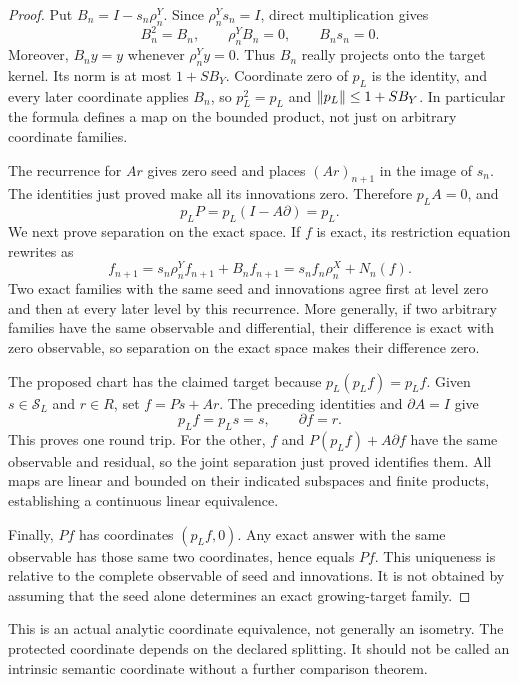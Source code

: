 \begin{proof}
Put \(B_n=I-s_n\rho^Y_n\). Since \(\rho^Y_ns_n=I\), direct multiplication gives
\[
 B_n^2=B_n,\qquad \rho^Y_nB_n=0,\qquad B_ns_n=0.
\]
Moreover, \(B_ny=y\) whenever \(\rho^Y_ny=0\). Thus \(B_n\) really projects onto the target kernel. Its norm is at most \(1+SB_Y\). Coordinate zero of \(p_L\) is the identity, and every later coordinate applies \(B_n\), so \(p_L^2=p_L\) and \(\left\lVert p_L\right\rVert\le1+SB_Y\). In particular the formula defines a map on the bounded product, not just on arbitrary coordinate families.

The recurrence for \(Ar\) gives zero seed and places \((Ar)_{n+1}\) in the image of \(s_n\). The identities just proved make all its innovations zero. Therefore \(p_LA=0\), and
\[
 p_LP=p_L(I-A\partial)=p_L.
\]
We next prove separation on the exact space. If \(f\) is exact, its restriction equation rewrites as
\[
 f_{n+1}=s_n\rho^Y_nf_{n+1}+B_nf_{n+1}
          =s_nf_n\rho^X_n+N_n(f).
\]
Two exact families with the same seed and innovations agree first at level zero and then at every later level by this recurrence. More generally, if two arbitrary families have the same observable and differential, their difference is exact with zero observable, so separation on the exact space makes their difference zero.

The proposed chart has the claimed target because \(p_L(p_Lf)=p_Lf\). Given \(s\in\mathcal S_L\) and \(r\in R\), set \(f=Ps+Ar\). The preceding identities and \(\partial A=I\) give
\[
 p_Lf=p_Ls=s,\qquad \partial f=r.
\]
This proves one round trip. For the other, \(f\) and \(P(p_Lf)+A\partial f\) have the same observable and residual, so the joint separation just proved identifies them. All maps are linear and bounded on their indicated subspaces and finite products, establishing a continuous linear equivalence.

Finally, \(Pf\) has coordinates \((p_Lf,0)\). Any exact answer with the same observable has those same two coordinates, hence equals \(Pf\). This uniqueness is relative to the complete observable of seed and innovations. It is not obtained by assuming that the seed alone determines an exact growing-target family.
\end{proof}
This is an actual analytic coordinate equivalence, not generally an isometry. The protected coordinate depends on the declared splitting. It should not be called an intrinsic semantic coordinate without a further comparison theorem.


